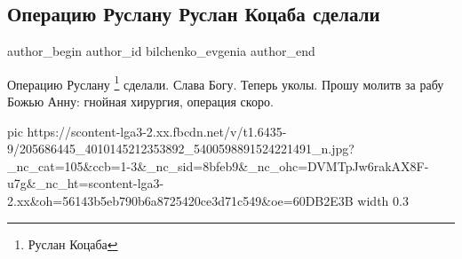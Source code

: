  
 
 
 
 
 
\subsection{Операцию Руслану Руслан Коцаба сделали}
\label{sec:25_06_2021.fb.bilchenko_evgenia.3.kocaba_ruslan_operacia_glaz}
\ifcmt
 author_begin
   author_id bilchenko_evgenia
 author_end
\fi

Операцию Руслану \footnote{Руслан Коцаба} сделали. Слава Богу. Теперь уколы. Прошу молитв
за рабу Божью Анну: гнойная хирургия, операция скоро.

\ifcmt
  pic https://scontent-lga3-2.xx.fbcdn.net/v/t1.6435-9/205686445_4010145212353892_5400598891524221491_n.jpg?_nc_cat=105&ccb=1-3&_nc_sid=8bfeb9&_nc_ohc=DVMTpJw6rakAX8F-u7g&_nc_ht=scontent-lga3-2.xx&oh=56143b5eb790b6a8725420ce3d71c549&oe=60DB2E3B
  width 0.3
\fi

